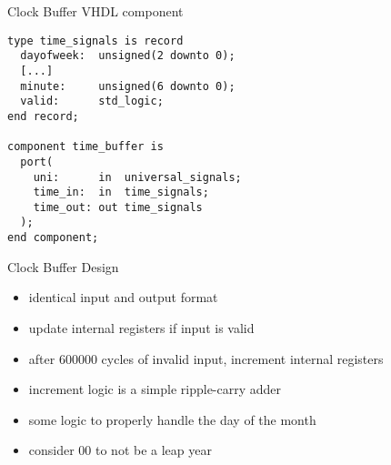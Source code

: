 \documentclass{beamer}
\begin{document}
\begin{frame}[fragile]{Clock Buffer VHDL component}
\begin{verbatim}
type time_signals is record
  dayofweek:  unsigned(2 downto 0);
  [...]
  minute:     unsigned(6 downto 0);
  valid:      std_logic;
end record;

component time_buffer is
  port(
    uni:      in  universal_signals;
    time_in:  in  time_signals;
    time_out: out time_signals
  );
end component;
\end{verbatim}
\end{frame}

\begin{frame}{Clock Buffer Design}
	\begin{itemize}
		\item identical input and output format
		\item update internal registers if input is valid
		\item after 600000 cycles of invalid input, increment internal registers
		\item increment logic is a simple ripple-carry adder
		\item some logic to properly handle the day of the month
		\item consider 00 to not be a leap year
	\end{itemize}
\end{frame}
\end{document}
